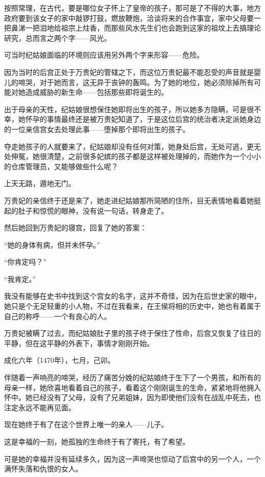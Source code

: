 \begin{multicols}{\theparacolNo}
		按照常理，在古代，要是哪位女子怀上了皇帝的孩子，那可是了不得的大事，地方政府要到该女子的家中敲锣打鼓，燃放鞭炮，洽谈将来的合作事宜，家中父母要一把鼻涕一把泪地给祖宗上炷香，而那些风水先生们也会跑到这家的祖坟上去搞理论研究，总而言之两个字——风光。

		可当时纪姑娘面临的环境则应该用另外两个字来形容——危险。

		因为当时的后宫正处于万贵妃的管辖之下，而这位万贵妃最不能忍受的声音就是婴儿的啼哭，对于她而言，这无异于丧钟的轰鸣。为了她的地位，她必须除掉所有可能对她造成威胁的新生命——包括那些即将诞生的。

		出于母亲的天性，纪姑娘很想保住她即将出生的孩子，所以她多方隐瞒，可是很不幸，她怀孕的事情最终还是被万贵妃知道了，于是这位后宫的统治者决定派她身边的一位亲信宫女去处理此事——堕掉那个即将出生的孩子。

		夺走她孩子的人就要来了，纪姑娘却没有任何对策，她身处后宫，无处可逃，更无处伸冤，她很清楚，之前很多妃嫔的孩子都是这样被处理掉的，而她作为一个小小的仓库管理员，又能够做些什么呢？

		上天无路，遁地无门。

		万贵妃的亲信终于还是来了，她走进纪姑娘那所简陋的住所，目无表情地看着她挺起的肚子和惊慌的眼神，没有说一句话，转身走了。

		然后她回到万贵妃的寝宫，回复了她的答案：

		“她的身体有病，但并未怀孕。”

		“你肯定吗？”

		“我肯定。”

		我没有能够在史书中找到这个宫女的名字，这并不奇怪，因为在后世史家的眼中，她只是个无足轻重的小人物，不过在我看来，在王侯将相的历史中，她也有着属于自己的称呼——一个有良心的人。

		万贵妃被瞒了过去，而纪姑娘肚子里的孩子终于保住了性命，后宫又恢复了往日的平静，但在这平静的外表下，事情才刚刚开始。

		成化六年（1470年），七月，己卯。

		伴随着一声响亮的啼哭，经历了痛苦分娩的纪姑娘终于生下了一个男孩，和所有的母亲一样，她欣喜地看着自己的孩子，看着这个刚刚诞生的生命，紧紧地将他拥入怀中。她已经没有了父母，没有了兄弟姐妹，因为即使他们没有在战乱中死去，也注定永远不能再见面。

		现在她终于有了在这个世界上唯一的亲人——儿子。

		这是幸福的一刻，她孤独的生命终于有了寄托，有了希望。

		可是她的幸福并没有延续多久，因为这一声啼哭也惊动了后宫中的另一个人，一个满怀失落和仇恨的女人。


\end{multicols}
